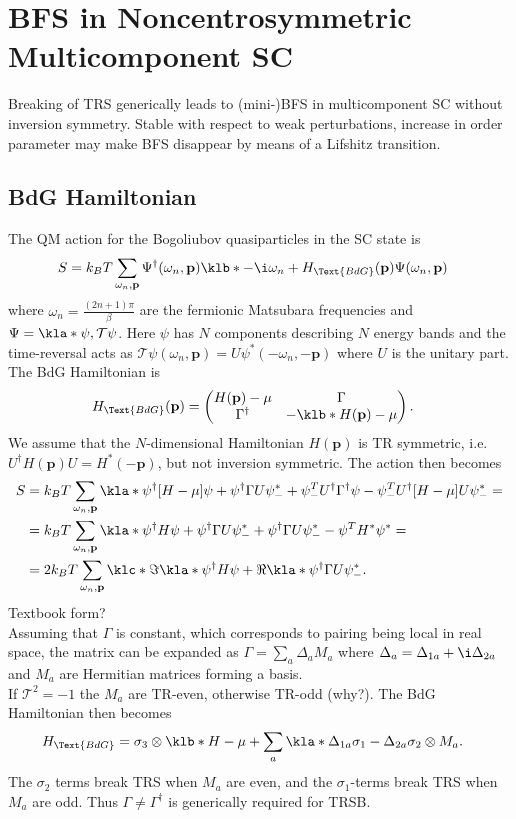 \documentclass[english, parskip=full]{scrartcl}
\newcommand{\qna}[1]{\color{red}#1\color{black}}
\begin{document}
\section{BFS in Noncentrosymmetric Multicomponent SC}
Breaking of TRS generically leads to (mini-)BFS in multicomponent SC without inversion symmetry.
Stable with respect to weak perturbations, increase in order parameter may make BFS disappear by means of a Lifshitz transition.
\subsection{BdG Hamiltonian}
The QM action for the Bogoliubov quasiparticles in the SC state is
\begin{align}
S &= k_BT \sum_{\omega_n,\textbf{p}} \Psi^\dagger(\omega_n, \textbf{p}) \klb*{-\i\omega_n + H_\Text{BdG}(\textbf{p})} \Psi(\omega_n, \textbf{p})
\end{align}
where $\omega_n = \frac{(2n+1)\pi}{\beta}$ are the fermionic Matsubara frequencies and $\Psi = \kla*{\psi, \mathcal{T}\psi}$.
Here $\psi$ has $N$ components describing $N$ energy bands and the time-reversal acts as $\mathcal{T}\psi(\omega_n,\textbf{p}) = U\psi^\ast (-\omega_n, -\textbf{p})$ where $U$ is the unitary part.
The BdG Hamiltonian is
\begin{align}
H_\Text{BdG}(\textbf{p}) &= \begin{pmatrix}
H(\textbf{p})-\mu & \Gamma \\ \Gamma^\dagger & -\klb*{H(\textbf{p}) - \mu }
\end{pmatrix}.
\end{align}
We assume that the $N$-dimensional Hamiltonian $H(\textbf{p})$ is TR symmetric, i.e. $U^\dagger H(\textbf{p}) U = H^\ast(-\textbf{p})$, but not inversion symmetric.
The action then becomes
\begin{align}
S &= k_BT \sum_{\omega_n, \textbf{p}} \kla*{ \psi^\dagger [H-\mu] \psi + \psi^\dagger \Gamma U\psi^\ast_- + \psi^T_- U^\dagger \Gamma^\dagger \psi - \psi^T_- U^\dagger [H-\mu] U\psi^\ast_-} = \\
&= k_BT \sum_{\omega_n, \textbf{p}} \kla*{ \psi^\dagger H \psi + \psi^\dagger \Gamma U\psi^\ast_- + \psi^\dagger \Gamma U\psi^\ast_- - \psi^T H^\ast \psi^\ast} = \\
&= 2k_BT \sum_{\omega_n, \textbf{p}} \klc*{\Im\kla*{ \psi^\dagger H \psi } + \Re\kla*{\psi^\dagger \Gamma U\psi^\ast_-} } .
\end{align}
\qna{Textbook form?}\\
Assuming that $\Gamma$ is constant, which corresponds to pairing being local in real space, the matrix can be expanded as $\Gamma = \sum_a\Delta_aM_a$ where $\Delta_a = \Delta_{1a} + \i \Delta_{2a}$ and $M_a$ are Hermitian matrices forming a basis.\\
If $\mathcal{T}^2 = -1$ the $M_a$ are TR-even, otherwise TR-odd (\qna{why?}).
The BdG Hamiltonian then becomes
\begin{align}
H_\Text{BdG} &= \sigma_3 \otimes \klb*{H - \mu } + \sum_a \kla*{\Delta_{1a} \sigma_1 -\Delta_{2a}\sigma_2} \otimes M_a.
\end{align}
The $\sigma_2$ terms break TRS when $M_a$ are even, and the $\sigma_1$-terms break TRS when $M_a$ are odd.
Thus $\Gamma\neq \Gamma^\dagger$ is generically required for TRSB.
\end{document}
